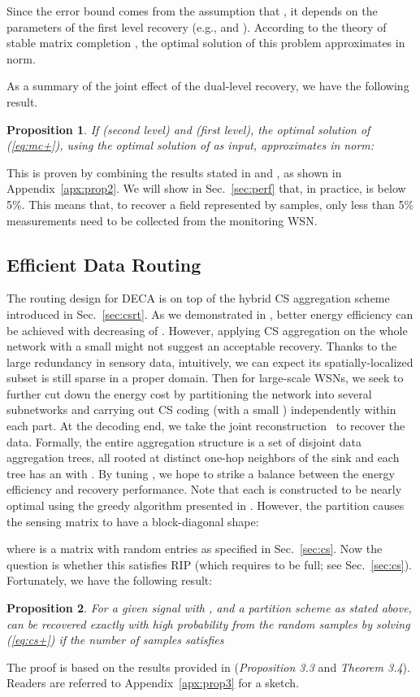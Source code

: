 \documentclass[conference]{IEEEtran}
\newtheorem{prop}{Proposition}
\begin{document}
Since the error bound  comes from the assumption that , it depends on the parameters of the first level recovery (e.g.,  and ). According to the theory of stable matrix completion \cite{CandesP-ProcIEEE10}, the optimal solution of this problem approximates  in  norm.

    As a summary of the joint effect of the dual-level recovery, we have the following result.
\begin{prop} \label{prop2}
If  (second level) and  (first level), the optimal solution of (\ref{eq:mc+}), using the optimal solution of  as input, approximates  in  norm:
      
\end{prop}
This is proven by combining the results stated in \cite{Candes-SPMag08} and \cite{CandesP-ProcIEEE10}, as shown in Appendix~\ref{apx:prop2}. We will show in Sec.~\ref{sec:perf} that, in practice,  is below 5\%. This means that, to recover a field represented by  samples, only less than 5\% measurements need to be collected from the monitoring WSN.

  \subsection{Efficient Data Routing} \label{sec:routing}
The routing design for DECA is on top of the hybrid CS aggregation scheme introduced in Sec.~\ref{sec:csrt}. As we demonstrated in \cite{XiangLV-SECON11}, better energy efficiency can be achieved with decreasing of . However, applying CS aggregation on the whole network with a small  might not suggest an acceptable recovery. Thanks to the large redundancy in sensory data, intuitively, we can expect its spatially-localized subset is still sparse in a proper domain. Then for large-scale WSNs, we seek to further cut down the energy cost by partitioning the network into several subnetworks and carrying out CS coding (with a small ) independently within each part. At the decoding end, we take the joint reconstruction~\cite{LeePSKO-GSN09} to recover the data. Formally, the entire aggregation structure is a set  of disjoint data aggregation trees, all rooted at distinct one-hop neighbors of the sink and each tree  has an  with . By tuning , we hope to strike a balance between the energy efficiency and recovery performance. Note that each  is constructed to be nearly optimal using the greedy algorithm presented in \cite{XiangLV-SECON11}. However, the partition causes the sensing matrix  to have a block-diagonal shape:
    
where  is a  matrix with random entries as specified in Sec.~\ref{sec:cs}. Now the question is whether this  satisfies RIP (which requires  to be full; see Sec.~\ref{sec:cs}). Fortunately, we have the following result:
    \begin{prop} \label{prop3}
       For a given signal  with , and a partition scheme as stated above,  can be recovered exactly with high probability from the random samples  by solving (\ref{eq:cs+}) if the number of samples satisfies 
    \end{prop}
The proof is based on the results provided in \cite{LeeO-ASC10} (\textit{Proposition 3.3} and \textit{Theorem 3.4}). Readers are referred to Appendix~\ref{apx:prop3} for a sketch.
\end{document}
